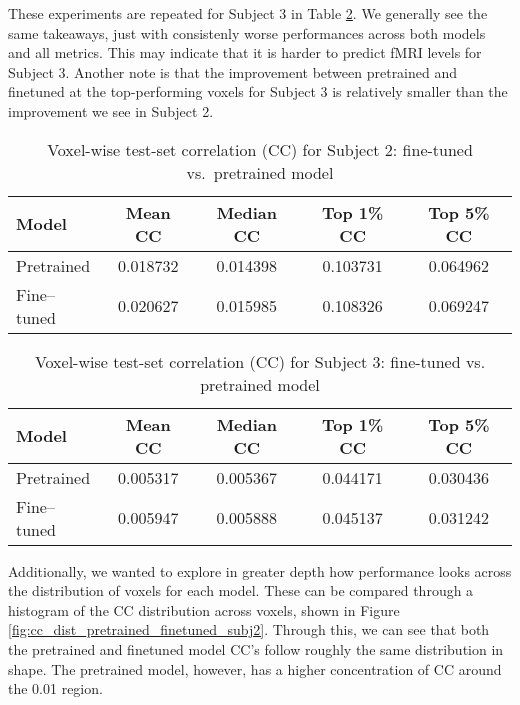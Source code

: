 \documentclass[10pt,letterpaper]{article}
\begin{document}
These experiments are repeated for Subject 3 in Table \ref{tab:cc_subject3_comparison_finetuned_vs_pretrained}. We generally see the same takeaways, just with consistenly worse performances across both models and all metrics. This may indicate that it is harder to predict fMRI levels for Subject 3. Another note is that the improvement between pretrained and finetuned at the top-performing voxels for Subject 3 is relatively smaller than the improvement we see in Subject 2.


\begin{table}[ht]
\centering
\caption{Voxel-wise test-set correlation (CC) for Subject 2: fine-tuned vs.\ pretrained model}
\label{tab:cc_subject2_comparison_finetuned_vs_pretrained}
\begin{tabular}{lcccc}
\toprule
\textbf{Model} & \textbf{Mean CC} & \textbf{Median CC} & \textbf{Top 1\% CC} & \textbf{Top 5\% CC} \\
\midrule
Pretrained & 0.018732 & 0.014398 & 0.103731 & 0.064962 \\
Fine–tuned & 0.020627 & 0.015985 & 0.108326 & 0.069247 \\
\bottomrule
\end{tabular}
\end{table}


\begin{table}[h!]
\centering
\caption{Voxel-wise test-set correlation (CC) for Subject 3: fine-tuned vs. pretrained model}
\label{tab:cc_subject3_comparison_finetuned_vs_pretrained}
\begin{tabular}{lcccc}
\toprule
\textbf{Model} & \textbf{Mean CC} & \textbf{Median CC} & \textbf{Top 1\% CC} & \textbf{Top 5\% CC} \\
\midrule
Pretrained & 0.005317 & 0.005367 & 0.044171 & 0.030436 \\
Fine–tuned & 0.005947 & 0.005888 & 0.045137 & 0.031242 \\
\bottomrule
\end{tabular}
\end{table}



Additionally, we wanted to explore in greater depth how performance looks across the distribution of voxels for each model. These can be compared through a histogram of the CC distribution across voxels, shown in Figure \ref{fig:cc_dist_pretrained_finetuned_subj2}. Through this, we can see that both the pretrained and finetuned model CC's follow roughly the same distribution in shape. The pretrained model, however, has a higher concentration of CC around the 0.01 region.
\end{document}
